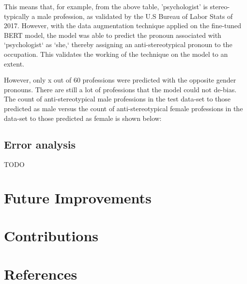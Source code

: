 \documentclass[10pt]{article}
\begin{document}
This means that, for example, from the above table, 'psychologist' is stereo-typically a male profession, as validated by the U.S Bureau of Labor Stats of 2017. However, with the data augmentation technique applied on the fine-tuned BERT model, the model was able to predict the pronoun associated with `psychologist` as `she,` thereby assigning an anti-stereotypical pronoun to the occupation. This validates the working of the technique on the model to an extent.

However, only x out of 60 professions were predicted with the opposite gender pronouns. There are still a lot of professions that the model could not de-bias. The count of anti-stereotypical male professions in the test data-set to those predicted as male versus the count of anti-stereotypical female professions in the data-set to those predicted as female is shown below:

\subsection{Error analysis}
\<TODO\>

\section{Future Improvements}


\section{Contributions}
    

\section{References}
\end{document}
